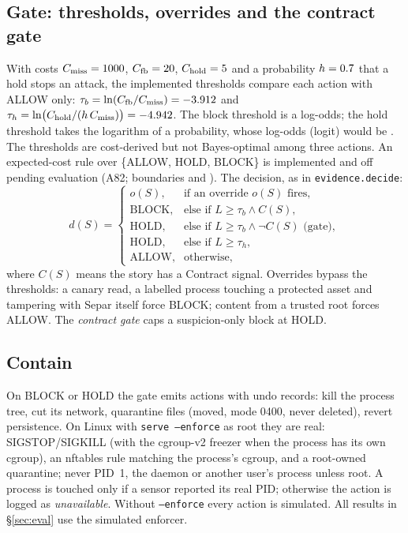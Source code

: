 \documentclass[10pt,twocolumn,letterpaper]{article}
\begin{document}
\subsection{Gate: thresholds, overrides and the contract gate}
With costs $C_{\text{miss}} = 1000$, $C_{\text{fb}} = 20$,
$C_{\text{hold}} = 5$ and a probability $h = 0.7$ that a hold stops an attack, the
implemented thresholds compare each action with ALLOW only:
$\tau_b = \ln(C_{\text{fb}}/C_{\text{miss}}) = -3.912$ and
$\tau_h = \ln\bigl(C_{\text{hold}}/(h\,C_{\text{miss}})\bigr) = -4.942$. The block threshold is a
log-odds; the hold threshold takes the logarithm of a probability, whose log-odds
(logit) would be \TauHoldLogit. The thresholds are cost-derived but not Bayes-optimal among three
actions. An expected-cost rule over \{ALLOW, HOLD, BLOCK\} is implemented and off pending
evaluation (A82; boundaries \ECHold{} and \ECBlock). The decision, as in
\texttt{evidence.decide}:
\begin{equation}
  d(S) =
  \begin{cases}
    o(S), & \text{if an override } o(S) \text{ fires},\\
    \text{BLOCK}, & \text{else if } L \ge \tau_b \land C(S),\\
    \text{HOLD}, & \text{else if } L \ge \tau_b \land \lnot C(S) \text{ (gate)},\\
    \text{HOLD}, & \text{else if } L \ge \tau_h,\\
    \text{ALLOW}, & \text{otherwise,}
  \end{cases}
\end{equation}
where $C(S)$ means the story has a Contract signal. Overrides bypass the thresholds: a canary read,
a labelled process touching a protected asset and tampering with Separ itself force BLOCK; content
from a trusted root forces ALLOW. The \emph{contract gate} caps a suspicion-only block at HOLD.

\subsection{Contain}
On BLOCK or HOLD the gate emits actions with undo records: kill the process tree, cut its network,
quarantine files (moved, mode 0400, never deleted), revert persistence. On Linux with
\texttt{serve --enforce} as root they are real: SIGSTOP/SIGKILL (with the cgroup-v2 freezer when
the process has its own cgroup), an nftables rule matching the process's cgroup, and a root-owned
quarantine; never PID~1, the daemon or another user's process unless root. A process is touched
only if a sensor reported its real PID; otherwise the action is logged as \emph{unavailable}.
Without \texttt{--enforce} every action is simulated. All results in \S\ref{sec:eval} use the
simulated enforcer.
\end{document}
